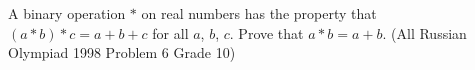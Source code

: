 A binary operation $*$ on real numbers has the property that $(a * b) * c = a+b+c$ for all $a$, $b$, $c$. Prove that $a * b = a+b$.
(All Russian Olympiad 1998 Problem 6 Grade 10)